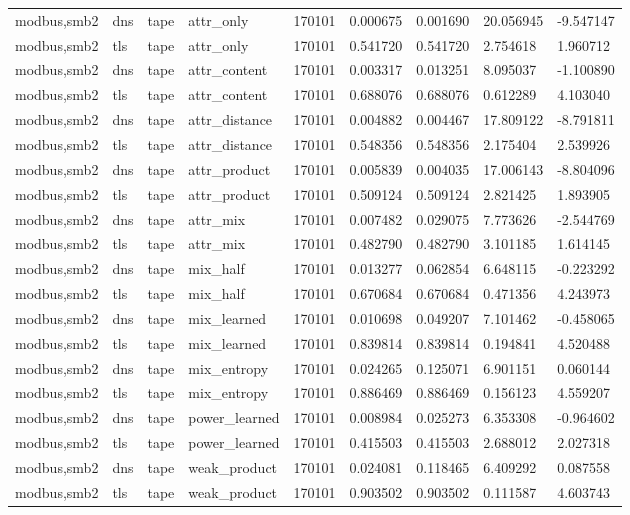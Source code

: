 \begin{tabular}{lllllllll}
modbus,smb2 & dns & tape & attr\_only & 170101 & 0.000675 & 0.001690 & 20.056945 & -9.547147 \\
modbus,smb2 & tls & tape & attr\_only & 170101 & 0.541720 & 0.541720 & 2.754618 & 1.960712 \\
modbus,smb2 & dns & tape & attr\_content & 170101 & 0.003317 & 0.013251 & 8.095037 & -1.100890 \\
modbus,smb2 & tls & tape & attr\_content & 170101 & 0.688076 & 0.688076 & 0.612289 & 4.103040 \\
modbus,smb2 & dns & tape & attr\_distance & 170101 & 0.004882 & 0.004467 & 17.809122 & -8.791811 \\
modbus,smb2 & tls & tape & attr\_distance & 170101 & 0.548356 & 0.548356 & 2.175404 & 2.539926 \\
modbus,smb2 & dns & tape & attr\_product & 170101 & 0.005839 & 0.004035 & 17.006143 & -8.804096 \\
modbus,smb2 & tls & tape & attr\_product & 170101 & 0.509124 & 0.509124 & 2.821425 & 1.893905 \\
modbus,smb2 & dns & tape & attr\_mix & 170101 & 0.007482 & 0.029075 & 7.773626 & -2.544769 \\
modbus,smb2 & tls & tape & attr\_mix & 170101 & 0.482790 & 0.482790 & 3.101185 & 1.614145 \\
modbus,smb2 & dns & tape & mix\_half & 170101 & 0.013277 & 0.062854 & 6.648115 & -0.223292 \\
modbus,smb2 & tls & tape & mix\_half & 170101 & 0.670684 & 0.670684 & 0.471356 & 4.243973 \\
modbus,smb2 & dns & tape & mix\_learned & 170101 & 0.010698 & 0.049207 & 7.101462 & -0.458065 \\
modbus,smb2 & tls & tape & mix\_learned & 170101 & 0.839814 & 0.839814 & 0.194841 & 4.520488 \\
modbus,smb2 & dns & tape & mix\_entropy & 170101 & 0.024265 & 0.125071 & 6.901151 & 0.060144 \\
modbus,smb2 & tls & tape & mix\_entropy & 170101 & 0.886469 & 0.886469 & 0.156123 & 4.559207 \\
modbus,smb2 & dns & tape & power\_learned & 170101 & 0.008984 & 0.025273 & 6.353308 & -0.964602 \\
modbus,smb2 & tls & tape & power\_learned & 170101 & 0.415503 & 0.415503 & 2.688012 & 2.027318 \\
modbus,smb2 & dns & tape & weak\_product & 170101 & 0.024081 & 0.118465 & 6.409292 & 0.087558 \\
modbus,smb2 & tls & tape & weak\_product & 170101 & 0.903502 & 0.903502 & 0.111587 & 4.603743 \\

\end{tabular}
